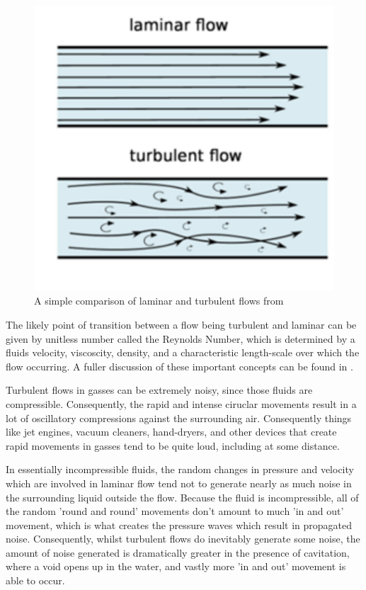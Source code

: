 \documentclass{article}\usepackage[]{graphicx}\usepackage[]{color}
\begin{document}
\begin{figure}
\includegraphics[width=\textwidth]{LaminarTurbulent.png}
\caption{A simple comparison of laminar and turbulent flows from  \citeyear{NPdotnet2017}}
\label{fig:LaminarTurbulent.png}
\end{figure}


The likely point of transition between a flow being turbulent and laminar can be given by unitless number called the Reynolds Number, which is determined by a fluids velocity, viscoscity, density, and a characteristic length-scale over which the flow occurring.  A fuller discussion of these important concepts can be found in  \citeyear{NPdotnet2017}.

Turbulent flows in gasses can be extremely noisy, since those fluids are compressible.  Consequently, the rapid and intense ciruclar movements result in a lot of oscillatory compressions against the surrounding air.  Consequently things like jet engines, vacuum cleaners, hand-dryers, and other devices that create rapid movements in gasses tend to be quite loud, including at some distance.

In essentially incompressible fluids, the random changes in pressure and velocity which are involved in laminar flow tend not to generate nearly as much noise in the surrounding liquid outside the flow.  Because the fluid is incompressible, all of the random 'round and round' movements don't amount to much 'in and out' movement, which is what creates the pressure waves which result in propagated noise. Consequently, whilst turbulent flows do inevitably generate some noise, the amount of noise generated is dramatically greater in the presence of cavitation, where a void opens up in the water, and vastly more 'in and out' movement is able to occur.
\end{document}
